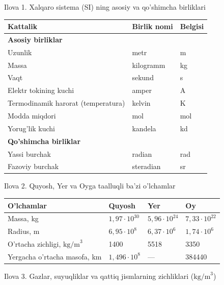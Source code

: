 


\Large{Ilova 1. Xalqaro sistema (SI) ning asosiy va qo'shimcha birliklari}
\begin{table}[!ht]
\centering
\begin{tabular}{lll}
\toprule
\textbf{Kattalik} & \textbf{Birlik nomi} & \textbf{Belgisi} \\
\midrule
\multicolumn{3}{l}{\textbf{Asosiy birliklar}} \\
\midrule
Uzunlik & metr & m \\
Massa & kilogramm & kg \\
Vaqt & sekund & s \\
Elektr tokining kuchi & amper & A \\
Termodinamik harorat (temperatura) & kelvin & K \\
Modda miqdori & mol & mol \\
Yorug'lik kuchi & kandela & kd \\
\midrule
\multicolumn{3}{l}{\textbf{Qo'shimcha birliklar}} \\
\midrule
Yassi burchak & radian & rad \\
Fazoviy burchak & steradian & sr \\
\bottomrule
\end{tabular}
\end{table}





\Large{Ilova 2. Quyosh, Yer va Oyga taalluqli ba'zi o'lchamlar}
\begin{table}[!ht]
\centering
\begin{tabular}{llll}
\toprule
\textbf{O'lchamlar} & \textbf{Quyosh} & \textbf{Yer} & \textbf{Oy} \\
\midrule
Massa, kg & $1,97 \cdot 10^{30}$ & $5,96 \cdot 10^{24}$ & $7,33 \cdot 10^{22}$ \\
Radius, m & $6,95 \cdot 10^8$ & $6,37 \cdot 10^6$ & $1,74 \cdot 10^6$ \\
O'rtacha zichligi, $\text{kg/m}^3$ & 1400 & 5518 & 3350 \\
Yergacha o'rtacha masofa, km & $1,496 \cdot 10^8$ & --- & 384440 \\
\bottomrule
\end{tabular}
\end{table}







\Large{Ilova 3. Gazlar, suyuqliklar va qattiq jismlarning zichliklari ($\text{kg/m}^3$)}

